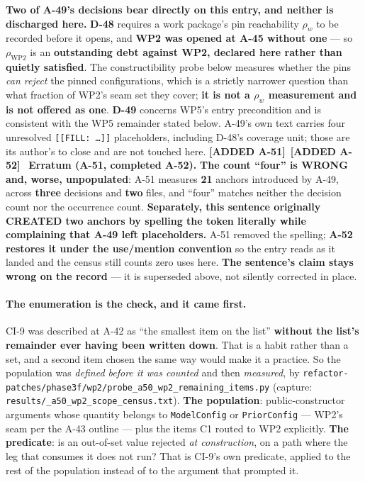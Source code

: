 \documentclass[
  10pt,
]{article}
\newcommand{\amdnew}[1]{{\color{amdcolor}\footnotesize\textbf{[ADDED #1]}}\ }
\begin{document}
\textbf{Two of A-49's decisions bear directly on this entry, and neither is discharged here.} \textbf{D-48} requires a work package's pin reachability $\rho_w$ to be recorded before it opens, and \textbf{WP2 was opened at A-45 without one} --- so $\rho_{\mathrm{WP2}}$ is an \textbf{outstanding debt against WP2, declared here rather than quietly satisfied}. The constructibility probe below measures whether the pins \emph{can reject} the pinned configurations, which is a strictly narrower question than what fraction of WP2's seam set they cover; \textbf{it is not a $\rho_w$ measurement and is not offered as one}. \textbf{D-49} concerns WP5's entry precondition and is consistent with the WP5 remainder stated below. A-49's own text carries four unresolved \texttt{[[FILL:~\dots]]} placeholders, including D-48's coverage unit; those are its author's to close and are not touched here.  %
\amdnew{A-51}\amdnew{A-52} \textbf{Erratum (A-51, completed A-52).} \textbf{The count ``four'' is WRONG and, worse, unpopulated}: A-51 measures \textbf{21} anchors introduced by A-49, across \textbf{three} decisions and \textbf{two} files, and ``four'' matches neither the decision count nor the occurrence count. \textbf{Separately, this sentence originally CREATED two anchors by spelling the token literally while complaining that A-49 left placeholders.} A-51 removed the spelling; \textbf{A-52 restores it under the use/mention convention} so the entry reads as it landed and the census still counts zero uses here. \textbf{The sentence's claim stays wrong on the record} --- it is superseded above, not silently corrected in place.

\paragraph{The enumeration is the check, and it came first.}
CI-9 was described at A-42 as ``the smallest item on the list'' \textbf{without the list's remainder ever having been written down}. That is a habit rather than a set, and a second item chosen the same way would make it a practice. So the population was \emph{defined before it was counted} and then \emph{measured}, by \texttt{refactor-patches/\allowbreak{}phase3f/\allowbreak{}wp2/\allowbreak{}probe\_a50\_wp2\_remaining\_items.py} (capture: \texttt{results/\allowbreak{}\_a50\_wp2\_scope\_census.txt}). \textbf{The population}: public-constructor arguments whose quantity belongs to \texttt{ModelConfig} or \texttt{PriorConfig} --- WP2's seam per the A-43 outline --- plus the items C1 routed to WP2 explicitly. \textbf{The predicate}: is an out-of-set value rejected \emph{at construction}, on a path where the leg that consumes it does not run? That is CI-9's own predicate, applied to the rest of the population instead of to the argument that prompted it.
\end{document}
